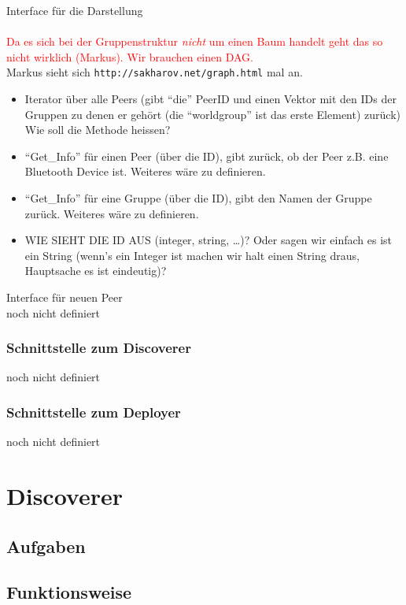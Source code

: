 \documentclass[10pt]{article}
\begin{document}
Interface f\"ur die Darstellung\\\\
\textcolor{red}{Da es sich bei der Gruppenstruktur \emph{nicht} um einen Baum handelt geht das so nicht wirklich (Markus).
Wir brauchen einen DAG.}\\
Markus sieht sich \verb+http://sakharov.net/graph.html+ mal an.
\begin{itemize}
	\item Iterator \"uber alle Peers (gibt ``die'' PeerID und einen Vektor mit den IDs der Gruppen zu
denen er geh\"ort (die ``worldgroup'' ist das erste Element) zur\"uck)\\
Wie soll die Methode heissen?
	\item ``Get\_Info'' f\"ur einen Peer (\"uber die ID), gibt zur\"uck, ob der Peer z.B. eine Bluetooth
Device ist. Weiteres w\"are zu definieren.
	\item ``Get\_Info'' f\"ur eine Gruppe (\"uber die ID), gibt den Namen der Gruppe zur\"uck. Weiteres
w\"are zu definieren.
	\item WIE SIEHT DIE ID AUS (integer, string, \ldots)? Oder sagen wir einfach es ist ein String
(wenn's ein Integer ist machen wir halt einen String draus, Hauptsache es ist eindeutig)?
\end{itemize}

Interface f\"ur neuen Peer\\
noch nicht definiert

\subsubsection{Schnittstelle zum Discoverer}
noch nicht definiert

\subsubsection{Schnittstelle zum Deployer}
noch nicht definiert

\section{Discoverer}
\subsection{Aufgaben}
\subsection{Funktionsweise}
\end{document}
